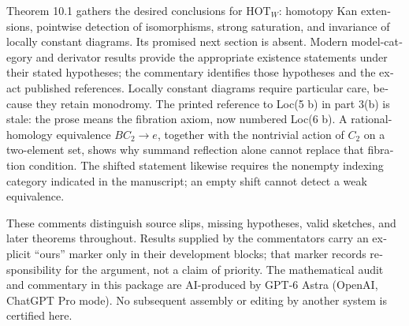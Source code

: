 \begin{otherlanguage}{english}
Theorem 10.1 gathers the desired conclusions for $\mathrm{HOT}_W$: homotopy Kan extensions, pointwise detection of isomorphisms, strong saturation, and invariance of locally constant diagrams. Its promised next section is absent. Modern model-category and derivator results provide the appropriate existence statements under their stated hypotheses; the commentary identifies those hypotheses and the exact published references. Locally constant diagrams require particular care, because they retain monodromy. The printed reference to Loc(5 b) in part 3(b) is stale: the prose means the fibration axiom, now numbered Loc(6 b). A rational-homology equivalence $BC_2\to e$, together with the nontrivial action of $C_2$ on a two-element set, shows why summand reflection alone cannot replace that fibration condition. The shifted statement likewise requires the nonempty indexing category indicated in the manuscript; an empty shift cannot detect a weak equivalence.

These comments distinguish source slips, missing hypotheses, valid sketches, and later theorems throughout. Results supplied by the commentators carry an explicit “ours” marker only in their development blocks; that marker records responsibility for the argument, not a claim of priority. The mathematical audit and commentary in this package are AI-produced by GPT-6 Astra (OpenAI, ChatGPT Pro mode). No subsequent assembly or editing by another system is certified here.

\end{otherlanguage}
